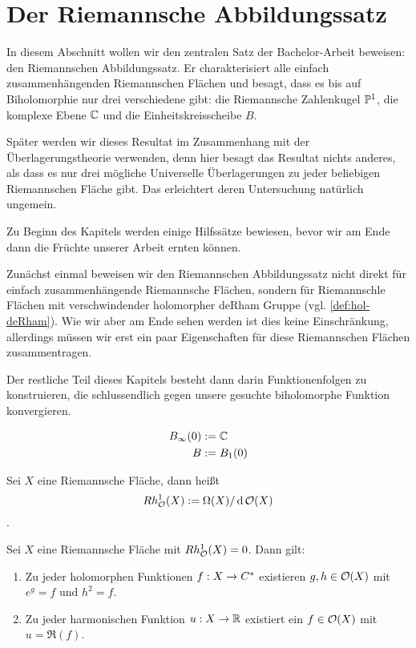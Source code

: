 \section{Der Riemannsche Abbildungssatz}
\label{sec:RMT}

In diesem Abschnitt wollen wir den zentralen Satz der Bachelor-Arbeit
beweisen: den Riemannschen Abbildungssatz. Er charakterisiert alle
einfach zusammenhängenden Riemannschen Flächen und besagt,
dass es bis auf Biholomorphie nur drei verschiedene gibt: die
Riemannsche Zahlenkugel $\P^1$, die komplexe Ebene $\C$
und die Einheitskreisscheibe $B$.

Später werden wir dieses Resultat im Zusammenhang mit der
Überlagerungstheorie verwenden, denn hier besagt das Resultat nichts
anderes, als dass es nur drei mögliche Universelle Überlagerungen zu
jeder beliebigen Riemannschen Fläche gibt. Das erleichtert deren
Untersuchung natürlich ungemein.

Zu Beginn des Kapitels werden einige Hilfssätze bewiesen, bevor wir am
Ende dann die Früchte unserer Arbeit ernten können.

Zunächst einmal beweisen wir den Riemannschen Abbildungssatz nicht
direkt für einfach zusammenhängende Riemannsche Flächen, sondern für
Riemannschle Flächen mit verschwindender holomorpher deRham Gruppe
(vgl. \ref{def:hol-deRham}). Wie wir aber am Ende sehen werden ist dies
keine Einschränkung, allerdings müssen wir erst ein paar Eigenschaften
für diese Riemannschen Flächen zusammentragen.

Der restliche Teil dieses Kapitels besteht dann darin Funktionenfolgen
zu konstruieren, die schlussendlich gegen unsere gesuchte biholomorphe
Funktion konvergieren.

\begin{defin}
  \begin{align*}
    B_\infty(0) & := \C \\
    B & := B_1(0)
  \end{align*}
\end{defin}

\begin{defin}
  \label{def:hol-deRham}
  Sei $X$ eine Riemannsche Fläche, dann heißt
  \[
  Rh_\hol^1(X) := \Omega(X)/\d[\hol(X)]
  \]
  .
\end{defin}

\begin{lemma}
  \label{lemma:ex-log}
  Sei $X$ eine Riemannsche Fläche mit $Rh^1_\hol(X) = 0$. Dann gilt:
  \begin{enumerate}
  \item Zu jeder holomorphen Funktionen $f: X \ra C^\ast$ existieren
    $g, h \in \hol(X)$ mit $e^g = f$ und $h^2 = f$.
  \item Zu jeder harmonischen Funktion $u: X \ra \R$ existiert ein $f
    \in \hol(X)$ mit $u = \Re(f)$.
  \end{enumerate}
\end{lemma}

